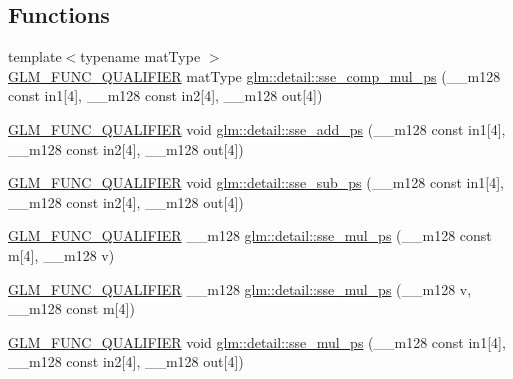 \subsection*{Functions}
\begin{DoxyCompactItemize}
\item 
{\footnotesize template$<$typename mat\+Type $>$ }\\\hyperlink{setup_8hpp_a33fdea6f91c5f834105f7415e2a64407}{G\+L\+M\+\_\+\+F\+U\+N\+C\+\_\+\+Q\+U\+A\+L\+I\+F\+I\+ER} mat\+Type \hyperlink{namespaceglm_1_1detail_ac35bd735c492f2e85e23bf313e4e411d}{glm\+::detail\+::sse\+\_\+comp\+\_\+mul\+\_\+ps} (\+\_\+\+\_\+m128 const in1\mbox{[}4\mbox{]}, \+\_\+\+\_\+m128 const in2\mbox{[}4\mbox{]}, \+\_\+\+\_\+m128 out\mbox{[}4\mbox{]})
\item 
\hyperlink{setup_8hpp_a33fdea6f91c5f834105f7415e2a64407}{G\+L\+M\+\_\+\+F\+U\+N\+C\+\_\+\+Q\+U\+A\+L\+I\+F\+I\+ER} void \hyperlink{namespaceglm_1_1detail_a98575d7c26d4b37787e31fa6c6d6e790}{glm\+::detail\+::sse\+\_\+add\+\_\+ps} (\+\_\+\+\_\+m128 const in1\mbox{[}4\mbox{]}, \+\_\+\+\_\+m128 const in2\mbox{[}4\mbox{]}, \+\_\+\+\_\+m128 out\mbox{[}4\mbox{]})
\item 
\hyperlink{setup_8hpp_a33fdea6f91c5f834105f7415e2a64407}{G\+L\+M\+\_\+\+F\+U\+N\+C\+\_\+\+Q\+U\+A\+L\+I\+F\+I\+ER} void \hyperlink{namespaceglm_1_1detail_a1464d6aecfcb5f9c78e2cd719e243b47}{glm\+::detail\+::sse\+\_\+sub\+\_\+ps} (\+\_\+\+\_\+m128 const in1\mbox{[}4\mbox{]}, \+\_\+\+\_\+m128 const in2\mbox{[}4\mbox{]}, \+\_\+\+\_\+m128 out\mbox{[}4\mbox{]})
\item 
\hyperlink{setup_8hpp_a33fdea6f91c5f834105f7415e2a64407}{G\+L\+M\+\_\+\+F\+U\+N\+C\+\_\+\+Q\+U\+A\+L\+I\+F\+I\+ER} \+\_\+\+\_\+m128 \hyperlink{namespaceglm_1_1detail_aca280cf461221f10ea24ff7836140707}{glm\+::detail\+::sse\+\_\+mul\+\_\+ps} (\+\_\+\+\_\+m128 const m\mbox{[}4\mbox{]}, \+\_\+\+\_\+m128 v)
\item 
\hyperlink{setup_8hpp_a33fdea6f91c5f834105f7415e2a64407}{G\+L\+M\+\_\+\+F\+U\+N\+C\+\_\+\+Q\+U\+A\+L\+I\+F\+I\+ER} \+\_\+\+\_\+m128 \hyperlink{namespaceglm_1_1detail_ae9a9deb7816d680bfb04ce2c6c29cf56}{glm\+::detail\+::sse\+\_\+mul\+\_\+ps} (\+\_\+\+\_\+m128 v, \+\_\+\+\_\+m128 const m\mbox{[}4\mbox{]})
\item 
\hyperlink{setup_8hpp_a33fdea6f91c5f834105f7415e2a64407}{G\+L\+M\+\_\+\+F\+U\+N\+C\+\_\+\+Q\+U\+A\+L\+I\+F\+I\+ER} void \hyperlink{namespaceglm_1_1detail_ae0751af388503f65d4b6c1ba3c62c24c}{glm\+::detail\+::sse\+\_\+mul\+\_\+ps} (\+\_\+\+\_\+m128 const in1\mbox{[}4\mbox{]}, \+\_\+\+\_\+m128 const in2\mbox{[}4\mbox{]}, \+\_\+\+\_\+m128 out\mbox{[}4\mbox{]})

\end{DoxyCompactItemize}
